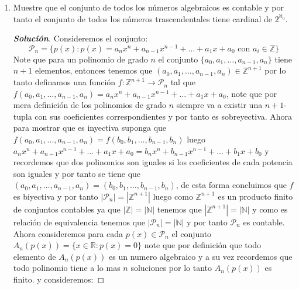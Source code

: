 \documentclass[11pt]{article}
\numberwithin{equation}{section}
\numberwithin{figure}{section}
\begin{document}
\begin{enumerate}
\begin{proof}[\textbf{Solución}]
   \begin{equation*}
       |\bigcup\limits_{k=0}^nF_k|=\sum\limits_{k=0}^n|F_k|=|F_0|+|F_1|+\dotsc+|F_n|\leq2^{\aleph_0}+2^{\aleph_0}+\dotsc+2^{\aleph_0}\leq\aleph_0\cdot2^{\aleph_0}=2^{\aleph_0}
   \end{equation*}
   De esta forma concluimos que $|\textbf{F}|\leq2^{\aleph_0}$ y por el teorema de Cantor-Bernstein tenemos que $|\textbf{F}|=2^{\aleph_0}$.
   \end{proof}
   \item Muestre que el conjunto de todos los números algebraicos es contable y por tanto el conjunto de todos los números trascendentales tiene cardinal de $2^{\aleph_0}$.
   \begin{proof}[\textbf{Solución}]
   Consideremos el conjunto:
   \begin{equation*}
    \mathcal{P}_n=\{p(x):p(x)=a_nx^n+a_{n-1}x^{n-1}+\dotsc+a_1x+a_0\text{ con }a_i\in\mathbb{Z}\}   
   \end{equation*}
   Note que para un polinomio de grado $n$ el conjunto $\{a_0,a_1,\dotsc,a_{n-1},a_n\}$ tiene $n+1$ elementos, entonces tenemos que $(a_0,a_1,\dotsc,a_{n-1},a_n)\in\mathbb{Z}^{n+1}$ por lo tanto definamos una función $f:\mathbb{Z}^{n+1}\longrightarrow\mathcal{P}_n$ tal que $f(a_0,a_1,\dotsc,a_{n-1},a_n)=a_nx^n+a_{n-1}x^{n-1}+\dotsc+a_1x+a_0$, note que por mera definición de los polinomios de grado $n$ siempre va a existir una $n+1$-tupla con sus coeficientes correspondientes y por tanto es sobreyectiva. Ahora para mostrar que es inyectiva suponga que $f(a_0,a_1,\dotsc,a_{n-1},a_n)=f(b_0,b_1,\dotsc,b_{n-1},b_n)$ luego $a_nx^n+a_{n-1}x^{n-1}+\dotsc+a_1x+a_0=b_nx^n+b_{n-1}x^{n-1}+\dotsc+b_1x+b_0$ y recordemos que dos polinomios son iguales si los coeficientes de cada potencia son iguales y por tanto se tiene que $(a_0,a_1,\dotsc,a_{n-1},a_n)=(b_0,b_1,\dotsc,b_{n-1},b_n)$, de esta forma concluimos que $f$ es biyectiva y por tanto $|\mathcal{P}_n|=|\mathbb{Z}^{n+1}|$ luego como $\mathbb{Z}^{n+1}$ es un producto finito de conjuntos contables ya que $|\mathbb{Z}|=|\mathbb{N}|$ tenemos que $|\mathbb{Z}^{n+1}|=|\mathbb{N}|$ y como es relación de equivalencia tenemos que $|\mathcal{P}_n|=|\mathbb{N}|$ y por tanto $\mathcal{P}_n$ es contable.\\
   Ahora consideremos para cada $p(x)\in\mathcal{P}_n$ el conjunto $A_n(p(x))=\{x\in\mathbb{R}:p(x)=0\}$ note que por definición que todo elemento de $A_n(p(x))$ es un numero algebraico y a su vez recordemos que todo polinomio tiene a lo mas $n$ soluciones por lo tanto $A_n(p(x))$ es finito. y consideremos:

\end{proof}
\end{enumerate}
\end{document}
